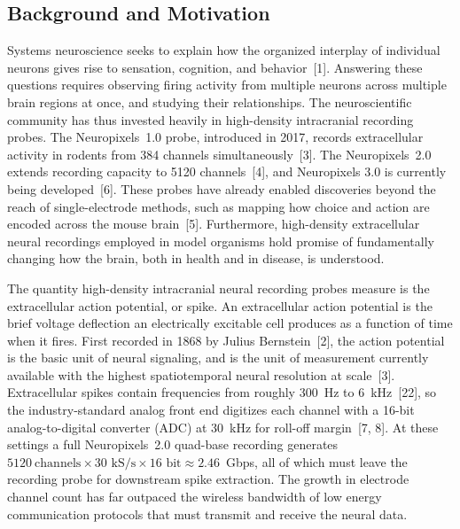 \documentclass[11pt]{article}
\begin{document}
\subsection{Background and Motivation}
Systems neuroscience seeks to explain how the organized interplay of individual neurons
gives rise to sensation, cognition, and behavior~[1]. Answering these questions requires
observing firing activity from multiple neurons across multiple brain regions at once, and studying their relationships.
The neuroscientific community has thus invested heavily in high-density intracranial recording probes. The
Neuropixels~1.0 probe, introduced in 2017, records extracellular activity in rodents from
384 channels simultaneously~[3]. The Neuropixels~2.0 extends recording
capacity to 5120 channels~[4], and Neuropixels 3.0 is currently being developed~[6]. These probes
have already enabled discoveries beyond the reach of single-electrode methods, such as
mapping how choice and action are encoded across the mouse brain~[5]. Furthermore,
high-density extracellular neural recordings employed in model organisms hold promise of
fundamentally changing how the brain, both in health and in disease, is understood.

The quantity high-density intracranial neural recording probes measure is the extracellular action potential, or spike. An
extracellular action potential is the brief voltage deflection an electrically excitable 
cell produces as a function of time when it fires. First
recorded in 1868 by Julius Bernstein~[2], the action potential is the basic unit of neural signaling,
and is the unit of measurement currently available with the highest spatiotemporal neural resolution at scale~[3].
Extracellular spikes contain frequencies from roughly 300~Hz to 6~kHz~[22], so the
industry-standard analog front end digitizes each channel with a 16-bit
analog-to-digital converter (ADC) at 30~kHz for roll-off margin~[7, 8]. At these settings
a full Neuropixels~2.0 quad-base recording generates $5120~\text{channels} \times
30\text{~kS/s} \times 16\text{~bit} \approx 2.46$~Gbps, all of which must leave the
recording probe for downstream spike extraction. The growth in electrode channel count
has far outpaced the wireless bandwidth of low energy communication protocols
that must transmit and receive the neural data.
\end{document}
